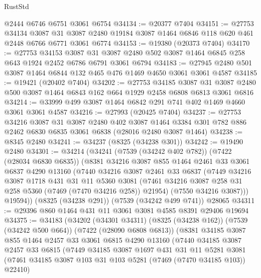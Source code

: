 \begin{lexlean}{RustStd}
\begin{coremodule}
    @2444
    @6746
    @6751
    @3061
    @6754
@34134 := @20377 @7404
@34151 := @27753
    @34134
    @3087
    @31
    @3087
    @2480
    @19184
    @3087
    @1464
    @6846
    @118
    @620
    @461
    @2448
    @6766
    @6771
    @3061
    @6774
@34153 := @19380 (@20373 @7404)
@34170 := @27753
    @34153
    @3087
    @31
    @3087
    @2480
    @502
    @3087
    @1464
    @6845
    @258
    @643
    @1924
    @2452
    @6786
    @6791
    @3061
    @6794
@34183 := @27945 @2480 @501 @3087 @1464 @6844 @132 @465 @476 @1469 @4650 @3061 @3061 @4587
@34185 := @19421 (@20402 @7404)
@34202 := @27753
    @34185
    @3087
    @31
    @3087
    @2480
    @500
    @3087
    @1464
    @6843
    @162
    @664
    @1929
    @2458
    @6808
    @6813
    @3061
    @6816
@34214 := @33999 @499 @3087 @1464 @6842 @291 @741 @402 @1469 @4660 @3061 @3061 @4587
@34216 := @27993 (@20425 @7404)
@34237 := @27753
    @34216
    @3087
    @31
    @3087
    @2480
    @402
    @3087
    @1464
    @3384
    @301
    @782
    @886
    @2462
    @6830
    @6835
    @3061
    @6838
    (@28016 @2480 @3087 @1464)
@34238 := @8345 @2480
@34241 := @34237 (@8325 (@34238 @301))
@34242 := @19490 @2480
@34301 := @34214
    (@34241
      (@7539 (@34242 @402 @782))
      (@7422 (@28034 @6830 @6835))
      (@8381
        @34216
        @3087
        @855
        @1464
        @2461
        @33
        @3061
        @6837
        @4290
        @13160
        (@7440
          @34216
          @3087
          @2461
          @33
          @6837
          (@7449
            @34216
            @3087
            @1718
            @431
            @31
            @11
            @5360
            @3081
            (@7461 @34216 @3087 @258 @31 @258 @5360 (@7469 (@7470 @34216 @258)) @21954)
            (@7550 @34216 @3087)))
        @19594))
    (@8325 (@34238 @291))
    (@7539 (@34242 @499 @741))
    @28065
@34311 := @29396 @860 @1464 @431 @11 @3061 @3081 @4585 @8391 @29406 @19694
@34375 := @34183
    (@34202
      (@34301 @34311)
      (@8325 (@34238 @162))
      (@7539 (@34242 @500 @664))
      (@7422 (@28090 @6808 @6813))
      (@8381
        @34185
        @3087
        @855
        @1464
        @2457
        @33
        @3061
        @6815
        @4290
        @13160
        (@7440
          @34185
          @3087
          @2457
          @33
          @6815
          (@7449
            @34185
            @3087
            @1697
            @431
            @31
            @11
            @5281
            @3081
            (@7461 @34185 @3087 @103 @31 @103 @5281 (@7469 (@7470 @34185 @103)) @22410)

\end{coremodule}
\end{lexlean}
